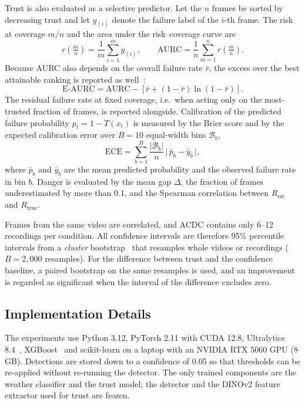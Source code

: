 \documentclass[pdflatex,sn-mathphys-num]{sn-jnl}
\newcommand{\Rtrue}{R_{\mathrm{true}}}
\newcommand{\Rest}{R_{\mathrm{est}}}
\begin{document}
Trust is also evaluated as a selective predictor. Let the $n$ frames be sorted by decreasing trust and let $y_{(i)}$ denote the failure label of the $i$-th frame. The risk at coverage $m/n$ and the area under the risk--coverage curve are
\begin{equation}
r\!\left(\tfrac{m}{n}\right) = \frac{1}{m}\sum_{i=1}^{m} y_{(i)}, \qquad
\mathrm{AURC} = \frac{1}{n}\sum_{m=1}^{n} r\!\left(\tfrac{m}{n}\right).
\label{eq:aurc}
\end{equation}
Because AURC also depends on the overall failure rate $\bar{r}$, the excess over the best attainable ranking is reported as well~\cite{geifman2019biasreduced}:
\begin{equation}
\mathrm{E\text{-}AURC} = \mathrm{AURC} - \left[\bar{r} + (1-\bar{r})\ln(1-\bar{r})\right].
\label{eq:eaurc}
\end{equation}
The residual failure rate at fixed coverage, i.e.\ when acting only on the most-trusted fraction of frames, is reported alongside. Calibration of the predicted failure probability $p_t = 1 - T(x_t)$ is measured by the Brier score and by the expected calibration error over $B=10$ equal-width bins $\mathcal{B}_b$,
\begin{equation}
\mathrm{ECE} = \sum_{b=1}^{B} \frac{|\mathcal{B}_b|}{n}\,\Big|\,\bar{p}_b - \bar{y}_b\,\Big|,
\label{eq:ece}
\end{equation}
where $\bar{p}_b$ and $\bar{y}_b$ are the mean predicted probability and the observed failure rate in bin $b$. Danger is evaluated by the mean gap $\Delta$, the fraction of frames underestimated by more than 0.1, and the Spearman correlation between $\Rest$ and $\Rtrue$.

Frames from the same video are correlated, and ACDC contains only 6--12 recordings per condition. All confidence intervals are therefore 95\% percentile intervals from a \emph{cluster} bootstrap~\cite{efron1993bootstrap} that resamples whole videos or recordings ($B = 2{,}000$ resamples). For the difference between trust and the confidence baseline, a paired bootstrap on the same resamples is used, and an improvement is regarded as significant when the interval of the difference excludes zero.

\subsection{Implementation Details}

The experiments use Python 3.12, PyTorch 2.11 with CUDA 12.8, Ultralytics 8.4~\cite{ultralytics}, XGBoost~\cite{chen2016xgboost} and scikit-learn on a laptop with an NVIDIA RTX 5060 GPU (8\,GB). Detections are stored down to a confidence of 0.05 so that thresholds can be re-applied without re-running the detector. The only trained components are the weather classifier and the trust model; the detector and the DINOv2 feature extractor used for trust are frozen.
\end{document}

